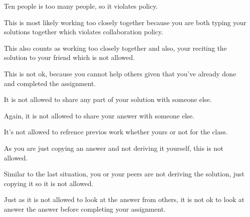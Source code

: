 \documentclass{61200}
\author{Miguel Flores-Acton}
\begin{document}

Ten people is too many people, so it violates policy.

This is most likely working too closely together because you are both
typing your solutions together which violates collaboration policy.

This also counts as working too closely together and also, your
reciting the solution to your friend which is not allowed.

This is not ok, because you cannot help others given that you've already
done and completed the assignment.

It is not allowed to share any part of your solution with someone else.

Again, it is not allowed to share your answer with someone else.

It's not allowed to refrence previos work whether yours or not for the class.

As you are just copying an answer and not deriving it yourself,
this is not allowed.

Similar to the last situation, you or your peers are not deriving the solution,
just copying it so it is not allowed.

Just as it is not allowed to look at the answer from others, it is not ok
to look at answer the answer before completing your assignment.


\end{document}
